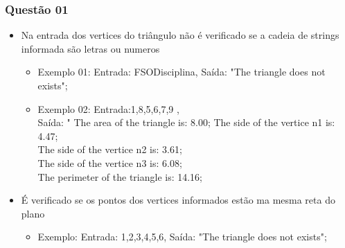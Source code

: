 \documentclass[11pt,a4paper]{article}
\begin{document}
\subsubsection{Questão 01}
\begin{itemize}
  \item Na entrada dos vertices do triângulo  não é verificado se a cadeia de
  strings informada são letras ou numeros

  \begin{itemize}
    \item Exemplo 01: Entrada: FSODisciplina, Saída: "The triangle does not exists";
    \item Exemplo 02: Entrada:1,8,5,6,7,9 , \\
    Saída: " The area of the triangle is: 8.00; The side of the vertice n1 is: 4.47; \\
    The side of the vertice n2 is: 3.61;\\
    The side of the vertice n3 is: 6.08;\\
    The perimeter of the triangle is: 14.16;\\
  \end{itemize}

  \item É verificado se os pontos dos vertices informados estão ma mesma reta do plano
  \begin{itemize}
    \item Exemplo: Entrada: 1,2,3,4,5,6, Saída: "The triangle does not exists";
  \end{itemize}
\end{itemize}
\end{document}
